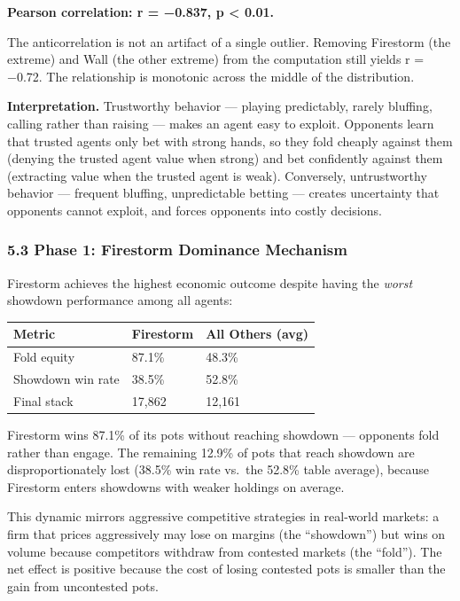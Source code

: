 \documentclass[
]{article}
\begin{document}
\textbf{Pearson correlation: r = −0.837, p \textless{} 0.01.}

The anticorrelation is not an artifact of a single outlier. Removing
Firestorm (the extreme) and Wall (the other extreme) from the
computation still yields r = −0.72. The relationship is monotonic across
the middle of the distribution.

\textbf{Interpretation.} Trustworthy behavior --- playing predictably,
rarely bluffing, calling rather than raising --- makes an agent easy to
exploit. Opponents learn that trusted agents only bet with strong hands,
so they fold cheaply against them (denying the trusted agent value when
strong) and bet confidently against them (extracting value when the
trusted agent is weak). Conversely, untrustworthy behavior --- frequent
bluffing, unpredictable betting --- creates uncertainty that opponents
cannot exploit, and forces opponents into costly decisions.

\hypertarget{phase-1-firestorm-dominance-mechanism}{%
\subsubsection{5.3 Phase 1: Firestorm Dominance
Mechanism}\label{phase-1-firestorm-dominance-mechanism}}

Firestorm achieves the highest economic outcome despite having the
\emph{worst} showdown performance among all agents:

\begin{longtable}[]{@{}lll@{}}
\toprule\noalign{}
Metric & Firestorm & All Others (avg) \\
\midrule\noalign{}
\endhead
\bottomrule\noalign{}
\endlastfoot
Fold equity & 87.1\% & 48.3\% \\
Showdown win rate & 38.5\% & 52.8\% \\
Final stack & 17,862 & 12,161 \\
\end{longtable}

Firestorm wins 87.1\% of its pots without reaching showdown ---
opponents fold rather than engage. The remaining 12.9\% of pots that
reach showdown are disproportionately lost (38.5\% win rate vs.~the
52.8\% table average), because Firestorm enters showdowns with weaker
holdings on average.

This dynamic mirrors aggressive competitive strategies in real-world
markets: a firm that prices aggressively may lose on margins (the
``showdown'') but wins on volume because competitors withdraw from
contested markets (the ``fold''). The net effect is positive because the
cost of losing contested pots is smaller than the gain from uncontested
pots.
\end{document}
